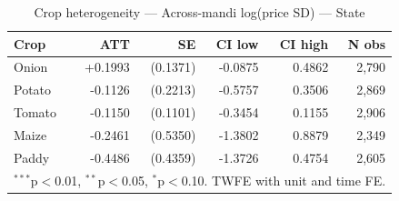 \begin{table}[htbp]
\centering
\caption{Crop heterogeneity — Across-mandi log(price SD) — State}
\label{tab:spec3_across_state_crops}
\begin{tabular}{lrrrrr}
\hline\hline
Crop & ATT & SE & CI low & CI high & N obs \\
\hline
Onion & +0.1993 & (0.1371) & -0.0875 & 0.4862 & 2,790 \\
Potato & -0.1126 & (0.2213) & -0.5757 & 0.3506 & 2,869 \\
Tomato & -0.1150 & (0.1101) & -0.3454 & 0.1155 & 2,906 \\
Maize & -0.2461 & (0.5350) & -1.3802 & 0.8879 & 2,349 \\
Paddy & -0.4486 & (0.4359) & -1.3726 & 0.4754 & 2,605 \\
\hline\hline
\multicolumn{6}{l}{\footnotesize $^{***}$p$<$0.01, $^{**}$p$<$0.05, $^{*}$p$<$0.10. TWFE with unit and time FE.} \\
\end{tabular}
\end{table}